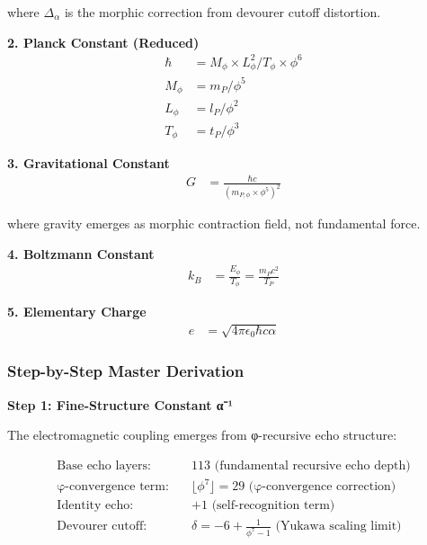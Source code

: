 where $\Delta_\alpha$ is the morphic correction from devourer cutoff distortion.

\textbf{2. Planck Constant (Reduced)}
\begin{align}
\hbar &= M_\phi \times L_\phi^2 / T_\phi \times \phi^6 \tag{Grace-minimal action with correction}\\
M_\phi &= m_P / \phi^5 \tag{φ-rescaled Planck mass}\\
L_\phi &= l_P / \phi^2 \tag{φ-rescaled Planck length}\\
T_\phi &= t_P / \phi^3 \tag{φ-rescaled Planck time}
\end{align}

\textbf{3. Gravitational Constant}
\begin{align}
G &= \frac{\hbar c}{(m_{P,\phi} \times \phi^5)^2} \tag{Morphic contraction rate}
\end{align}

where gravity emerges as morphic contraction field, not fundamental force.

\textbf{4. Boltzmann Constant}
\begin{align}
k_B &= \frac{E_\phi}{T_\phi} = \frac{m_P c^2}{T_P} \tag{Entropy per coherence echo}
\end{align}

\textbf{5. Elementary Charge}
\begin{align}
e &= \sqrt{4\pi\epsilon_0 \hbar c \alpha} \tag{Fundamental morphic chirality packet}
\end{align}

\subsubsection{Step-by-Step Master Derivation}

\textbf{Step 1: Fine-Structure Constant α⁻¹}

The electromagnetic coupling emerges from φ-recursive echo structure:

\begin{align}
\text{Base echo layers:} \quad &113 \text{ (fundamental recursive echo depth)}\\
\text{φ-convergence term:} \quad &\lfloor\phi^7\rfloor = 29 \text{ (φ-convergence correction)}\\
\text{Identity echo:} \quad &+1 \text{ (self-recognition term)}\\
\text{Devourer cutoff:} \quad &\delta = -6 + \frac{1}{\phi^7 - 1} \text{ (Yukawa scaling limit)}
\end{align}

